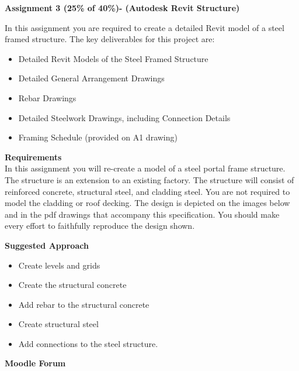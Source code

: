 
	
\begin{flushleft}
\Large\textbf{Assignment 3 (25\% of 40\%)- (Autodesk Revit Structure) }\\
\end{flushleft}

In this assignment you are required to create a detailed Revit model of a steel framed structure.  The key deliverables for this project are:

\begin{itemize}
	\item Detailed Revit Models of the Steel Framed Structure
	\item Detailed General Arrangement Drawings
	\item Rebar Drawings
	\item Detailed Steelwork Drawings, including Connection Details
	\item Framing Schedule (provided on A1 drawing) 
\end{itemize}

\textbf{Requirements}\\


In this assignment you will re-create a model of a steel portal frame structure.  The structure is an extension to an existing factory.  The structure will consist of reinforced concrete, structural steel, and cladding steel.  You are not required to model the cladding or roof decking.  The design is depicted on the images below and in the pdf drawings that accompany this specification.  You should make every effort to faithfully reproduce the design shown.

\vspace{.5cm}

\textbf{Suggested Approach}

\begin{itemize}
	\item Create levels and grids
	\item Create the structural concrete
	\item Add rebar to the structural concrete
	\item Create structural steel
	\item Add connections to the steel structure.
\end{itemize}


\vspace{.5cm}

\textbf{Moodle Forum}\\

